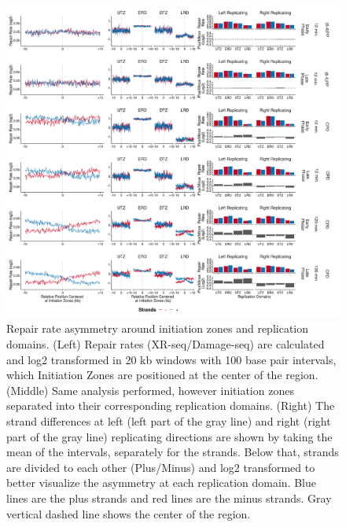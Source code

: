 \begin{figure}[H]
    \begin{center}
    \includegraphics[width=\textwidth]{Chapters/4_results/figures/fig6}
    \caption[Repair rate asymmetry around initiation zones and replication domains.]{Repair rate asymmetry around initiation zones and replication domains. (Left) Repair rates (XR-seq/Damage-seq) are calculated and log2 transformed in 20 kb windows with 100 base pair intervals, which Initiation Zones are positioned at the center of the region. (Middle) Same analysis performed, however initiation zones separated into their corresponding replication domains. (Right) The strand differences at left (left part of the gray line) and right (right part of the gray line) replicating directions are shown by taking the mean of the intervals, separately for the strands. Below that, strands are divided to each other (Plus/Minus) and log2 transformed to better visualize the asymmetry at each replication domain. Blue lines are the plus strands and red lines are the minus strands. Gray vertical dashed line shows the center of the region.}
    \label{fig:repairrate}
    \end{center}
    \end{figure}